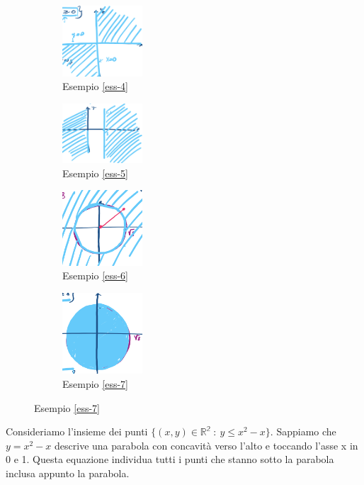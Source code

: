 \begin{figure}[h!]
\centering
\begin{subfigure}{.23\textwidth}
    \centering
    \includegraphics[width=3cm]{images/disegno-R3-ess4.png}
    \caption{Esempio \ref{ess-4}}
\end{subfigure}
\begin{subfigure}{.23\textwidth}
    \centering
    \includegraphics[width=3cm]{images/disegno-R3-ess5.png}
    \caption{Esempio \ref{ess-5}}
\end{subfigure}
\begin{subfigure}{.23\textwidth}
    \centering
    \includegraphics[width=3cm]{images/disegno-R3-ess6.png}
    \caption{Esempio \ref{ess-6}}
\end{subfigure}
\begin{subfigure}{.23\textwidth}
    \centering
    \includegraphics[width=3cm]{images/disegno-R3-ess7.png}
    \caption{Esempio \ref{ess-7}}
\end{subfigure}
\end{figure}

\begin{example}\label{ess-8}
Consideriamo l'insieme dei punti $\{(x,y) \in \mathbb{R^2} \::\: y \leq x^2 - x\}$. Sappiamo che $y = x^2 -x$ descrive una parabola con concavità verso l'alto e toccando l'asse x in 0 e 1. Questa equazione individua tutti i punti che stanno sotto la parabola inclusa appunto la parabola.
\end{example}

